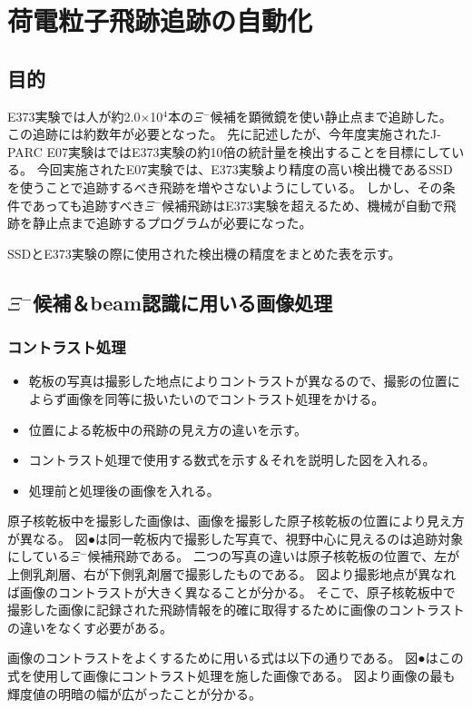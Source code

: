 \documentclass[12pt,a4paper]{jarticle}
\begin{document}
\newpage
\section{荷電粒子飛跡追跡の自動化}
\subsection{目的}
E373実験では人が約2.0×10$^4$本の$\Xi$$^-$候補を顕微鏡を使い静止点まで追跡した。
この追跡には約数年が必要となった。
先に記述したが、今年度実施されたJ-PARC E07実験はではE373実験の約10倍の統計量を検出することを目標にしている。
今回実施されたE07実験では、E373実験より精度の高い検出機であるSSDを使うことで追跡するべき飛跡を増やさないようにしている。
しかし、その条件であっても追跡すべき$\Xi$$^-$候補飛跡はE373実験を超えるため、機械が自動で飛跡を静止点まで追跡するプログラムが必要になった。
\par
SSDとE373実験の際に使用された検出機の精度をまとめた表を示す。
\subsection{$\Xi$$^-$候補＆beam認識に用いる画像処理}
\subsubsection{コントラスト処理}
\begin{itemize}
    \item 乾板の写真は撮影した地点によりコントラストが異なるので、撮影の位置によらず画像を同等に扱いたいのでコントラスト処理をかける。
    \item 位置による乾板中の飛跡の見え方の違いを示す。
    \item コントラスト処理で使用する数式を示す＆それを説明した図を入れる。
    \item 処理前と処理後の画像を入れる。
\end{itemize}
原子核乾板中を撮影した画像は、画像を撮影した原子核乾板の位置により見え方が異なる。
図●は同一乾板内で撮影した写真で、視野中心に見えるのは追跡対象にしている$\Xi$$^-$候補飛跡である。
二つの写真の違いは原子核乾板の位置で、左が上側乳剤層、右が下側乳剤層で撮影したものである。
図より撮影地点が異なれば画像のコントラストが大きく異なることが分かる。
そこで、原子核乾板中で撮影した画像に記録された飛跡情報を的確に取得するために画像のコントラストの違いをなくす必要がある。
\par
画像のコントラストをよくするために用いる式は以下の通りである。
図●はこの式を使用して画像にコントラスト処理を施した画像である。
図より画像の最も輝度値の明暗の幅が広がったことが分かる。
\end{document}
